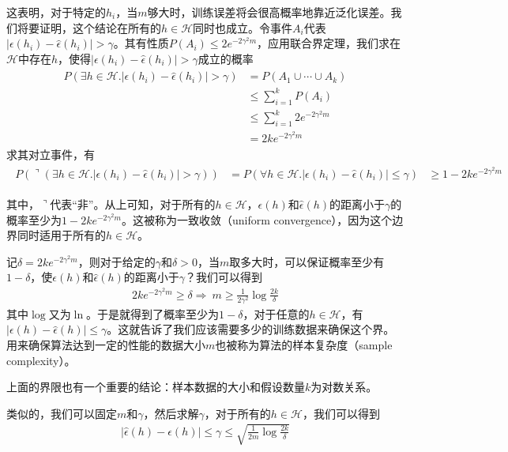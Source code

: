 这表明，对于特定的$h_i$，当$m$够大时，训练误差将会很高概率地靠近泛化误差。我们将要证明，这个结论在所有的$h\in\mathcal{H}$同时也成立。令事件$A_i$代表$|\epsilon(h_i)-\hat{\epsilon}(h_i)|>\gamma$。其有性质$P(A_i)\leq 2e^{-2\gamma^2m} $，应用联合界定理，我们求在$\mathcal{H}$中存在$h$，使得$|\epsilon(h_i)-\hat{\epsilon}(h_i)|>\gamma$成立的概率
\begin{eqnarray}
\begin{aligned}
P(\exists h\in \mathcal{H}.|\epsilon(h_i)-\hat{\epsilon}(h_i)|>\gamma ) &= P(A_1\cup\cdots\cup A_k)\\
&\leq \sum_{i=1}^kP(A_i)\\
&\leq \sum_{i=1}^k 2e^{-2\gamma^2m}\\
&= 2ke^{-2\gamma^2m}
\end{aligned}
\end{eqnarray}
求其对立事件，有
\begin{eqnarray}
\begin{aligned}
P(\urcorner(\exists h\in \mathcal{H}.|\epsilon(h_i)-\hat{\epsilon}(h_i)|>\gamma)) &= P(\forall h\in \mathcal{H}.|\epsilon(h_i)-\hat{\epsilon}(h_i)|\leq\gamma )
&\geq 1-2ke^{-2\gamma^2m}
\end{aligned}
\end{eqnarray}

其中，$\urcorner$代表“非”。从上可知，对于所有的$h\in\mathcal{H}$，$\epsilon(h)$和$\hat{\epsilon}(h)$的距离小于$\gamma$的概率至少为$1-2ke^{-2\gamma^2m}$。这被称为一致收敛（uniform convergence），因为这个边界同时适用于所有的$h\in\mathcal{H}$。

记$\delta=2ke^{-2\gamma^2m}$，则对于给定的$\gamma$和$\delta>0$，当$m$取多大时，可以保证概率至少有$1-\delta$，使$\epsilon(h)$和$\hat{\epsilon}(h)$的距离小于$\gamma$？我们可以得到
\begin{eqnarray}
2ke^{-2\gamma^2m} \geq \delta \Rightarrow\ m\geq \frac{1}{2\gamma^2}\log\frac{2k}{\delta}
\end{eqnarray}
其中$\log$又为$\ln$。于是就得到了概率至少为$1-\delta$，对于任意的$h\in\mathcal{H}$，有$|\epsilon(h)-\hat{\epsilon}(h)|\leq \gamma$。这就告诉了我们应该需要多少的训练数据来确保这个界。用来确保算法达到一定的性能的数据大小$m$也被称为算法的样本复杂度（sample complexity）。

上面的界限也有一个重要的结论：样本数据的大小和假设数量$k$为对数关系。

类似的，我们可以固定$m$和$\gamma$，然后求解$\gamma$，对于所有的$h\in\mathcal{H}$，我们可以得到
\begin{eqnarray}
|\hat{\epsilon}(h)-\epsilon(h)|\leq \gamma \leq \sqrt{\frac{1}{2m}\log\frac{2k}{\delta}}
\end{eqnarray}

